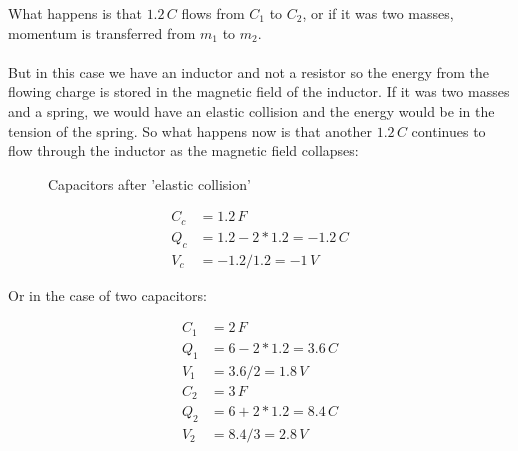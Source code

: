 \documentclass[]{elementary-physics}
\begin{document}
What happens is that $1.2 \, C$ flows from $C_1$ to $C_2$, or if it was two masses, momentum is transferred from $m_1$ to $m_2$.\\
\\
But in this case we have an inductor and not a resistor so the energy from the flowing charge is stored in the magnetic field of the inductor.
If it was two masses and a spring, we would have an elastic collision and the energy would be in the tension of the spring.
So what happens now is that another $1.2 \, C$ continues to flow through the inductor as the magnetic field collapses:

\begin{figure}[ht] \centering
	\qquad
	\caption{Capacitors after 'elastic collision'}
\end{figure}

\begin{subequations}
\begin{align}
C_c &= 1.2 \, F \\
Q_c &= 1.2 - 2*1.2 = -1.2 \, C \\
V_c &= -1.2 / 1.2 = -1 \, V
\end{align}
\end{subequations}

Or in the case of two capacitors:

\begin{subequations}
\begin{align}
C_1 &= 2 \, F \\
Q_1 &= 6 - 2*1.2 = 3.6 \, C \\
V_1 &= 3.6 / 2 = 1.8 \, V \\
C_2 &= 3 \, F \\
Q_2 &= 6 + 2*1.2 = 8.4 \, C \\
V_2 &= 8.4 / 3 = 2.8 \, V 
\end{align}
\end{subequations}
\end{document}
